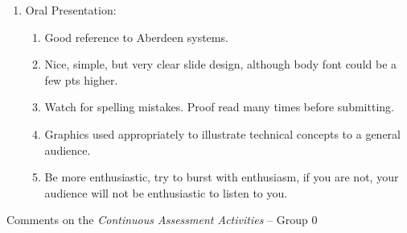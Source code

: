 \documentclass[14pt,twoside]{report}
\begin{document}
\begin{enumerate}
\item Oral Presentation:
\begin{enumerate}
%
\item Good reference to Aberdeen systems. 
%
\item Nice, simple, but very clear slide design, although body font could be a few pts higher. 
%
\item Watch for spelling mistakes. Proof read many times before submitting.
%
\item Graphics used appropriately to illustrate technical concepts to a general audience. 
%
\item Be more enthusiastic, try to burst with enthusiasm, if you are not, your audience will not be enthusiastic to listen to you.
%
\end{enumerate}

\end{enumerate}


\clearpage




\bigskip

\begin{center}
  {\Large Comments on the {\it Continuous Assessment Activities} -- Group 0}
\end{center}
\end{document}
